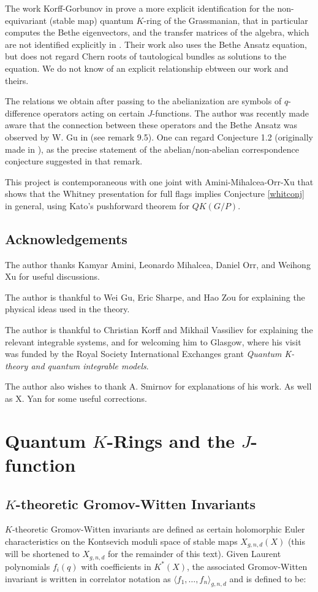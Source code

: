\documentclass[11pt,letterpaper]{amsart}
\begin{document}
 The work Korff-Gorbunov in \cite{korff} prove a more explicit identification for the non-equivariant (stable map) quantum $K$-ring of the Grassmanian, that in particular computes the Bethe eigenvectors, and the transfer matrices of the algebra, which are not identified explicitly in \cite{manybody}. Their work also uses the Bethe Ansatz equation, but does not regard Chern roots of tautological bundles as solutions to the equation. We do not know of an explicit relationship ebtween our work and theirs. 

The relations we obtain after passing to the abelianization are symbols of $q$-difference operators acting on certain $J$-functions. The author was recently made aware that the connection between these operators and the Bethe Ansatz was observed by W. Gu in \cite{conj} (see remark 9.5). One can regard Conjecture 1.2 (originally made in \cite{me}), as the precise statement of the abelian/non-abelian correspondence conjecture suggested in that remark.

This project is contemporaneous with one joint with Amini-Mihalcea-Orr-Xu that shows that the Whitney presentation for full flags implies Conjecture \ref{whitconj} in general, using Kato's pushforward theorem for $QK(G/P)$. 


\subsection*{Acknowledgements}
The author thanks Kamyar Amini, Leonardo Mihalcea, Daniel Orr, and Weihong Xu for useful discussions. 

The author is thankful to Wei Gu, Eric Sharpe, and Hao Zou for explaining the physical ideas used in the theory. 

The author is thankful to Christian Korff and Mikhail Vassiliev for explaining the relevant integrable systems, and for welcoming him to Glasgow, where his visit was funded by the Royal Society International Exchanges grant \emph{Quantum K-theory and quantum integrable models}.  

The author also wishes to thank A. Smirnov for explanations of his work.
As well as X. Yan for some useful corrections. 

\section{Quantum $K$-Rings and the $J$-function}

\subsection{$K$-theoretic Gromov-Witten Invariants}
$K$-theoretic Gromov-Witten invariants are defined as certain holomorphic Euler characteristics on the Kontsevich moduli space of stable maps $X_{g,n,d}(X)$ (this will be shortened to $X_{g,n,d}$ for the remainder of this text). Given Laurent polynomials $f_i(q)$ with coefficients in $K^*(X)$, the associated Gromov-Witten invariant is written in correlator notation as $\langle f_1,\dots,f_n\rangle_{g,n,d}$ and is defined to be:
\end{document}
